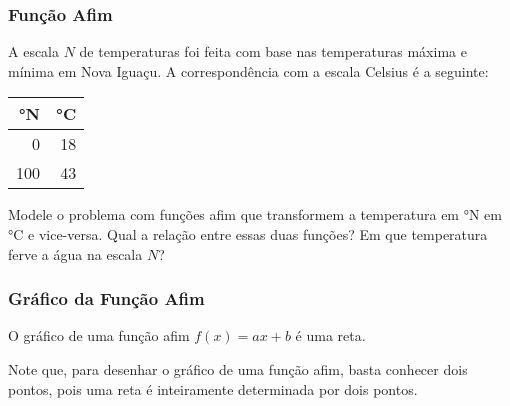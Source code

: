 \begin{frame}
\frametitle{Função Afim} 

\begin{exemplo}
    A escala $N$ de temperaturas foi feita com base nas temperaturas
máxima e mínima em Nova Iguaçu. A correspondência com a escala
Celsius é a seguinte:
\begin{center}
\begin{tabular}{|r|r|}
	\hline
	°N & °C \\ \hline
	0 & 18 \\ \hline
	100 & 43 \\
	\hline
\end{tabular}
\end{center}
Modele o problema com funções afim que transformem a temperatura em
°N em °C e vice-versa. Qual a relação entre essas duas funções? Em
que temperatura ferve a água na escala $N$?
\end{exemplo}

\end{frame}


\begin{frame}
\frametitle{Gráfico da Função Afim} 
\begin{proposicao}
O gráfico de uma função afim $f(x) = ax + b$ é uma reta.
\end{proposicao}\pause
Note que, para desenhar o gráfico de uma função afim, basta conhecer
dois pontos, pois uma reta é inteiramente determinada por dois
pontos.

\end{frame}


    
    
    
